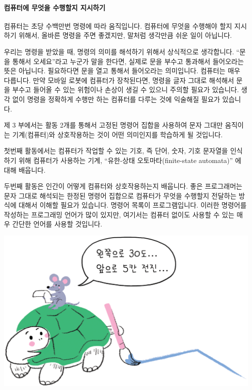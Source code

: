 \documentclass[]{article}
\begin{document}
\mbox{}\paragraph{컴퓨터에 무엇을 수행할지 지시하기}\label{section-153}

컴퓨터는 초당 수백만번 명령에 따라 움직입니다. 컴퓨터에 무엇을 수행해야
할지 지시하기 위해서, 올바른 명령을 주면 좋겠지만, 말처럼 생각만큼 쉬운
일이 아닙니다.

우리는 명령을 받았을 때, 명령의 의미를 해석하기 위해서 상식적으로
생각합니다. ``문을 통해서 오세요''라고 누군가 말을 한다면, 실제로 문을
부수고 통과해서 들어오라는 뜻은 아닙니다. 필요하다면 문을 열고 통해서
들어오라는 의미입니다. 컴퓨터는 매우 다릅니다. 만약 모바일 로봇에
컴퓨터가 장착된다면, 명령을 글자 그대로 해석해서 문을 부수고 들어올 수
있는 위험이나 손상이 생길 수 있으니 주의할 필요가 있습니다. 생각 없이
명령을 정확하게 수행만 하는 컴퓨터를 다루는 것에 익술해질 필요가
있습니다.

제 3 부에서는 활동 2개를 통해서 고정된 명령어 집합을 사용하여 문자
그대만 움직이는 기계(컴퓨터)와 상호작용하는 것이 어떤 의미인지를
학습하게 될 것입니다.

첫번째 활동에서는 컴퓨터가 작업할 수 있는 기호, 즉 단어, 숫자, 기호
문자열을 인식하기 위해 컴퓨터가 사용하는 기계, ``유한-상태
오토마타(finite-state automata)'' 에 대해 배웁니다.

두번째 활동은 인간이 어떻게 컴퓨터와 상호작용하는지 배웁니다. 좋은
프로그래머는 문자 그대로 해석되는 한정된 명령어 집합으로 컴퓨터가 무엇을
수행할지 전달하는 방식에 대해서 이해할 필요가 있습니다. 명령어 목록이
프로그램입니다. 이러한 명령어를 작성하는 프로그래밍 언어가 많이 있지만,
여기서는 컴퓨터 없이도 사용할 수 있는 매우 간단한 언어를 사용할
것입니다.

\includegraphics{csunplugged/03-part/img/03-part-three.png}
\end{document}
